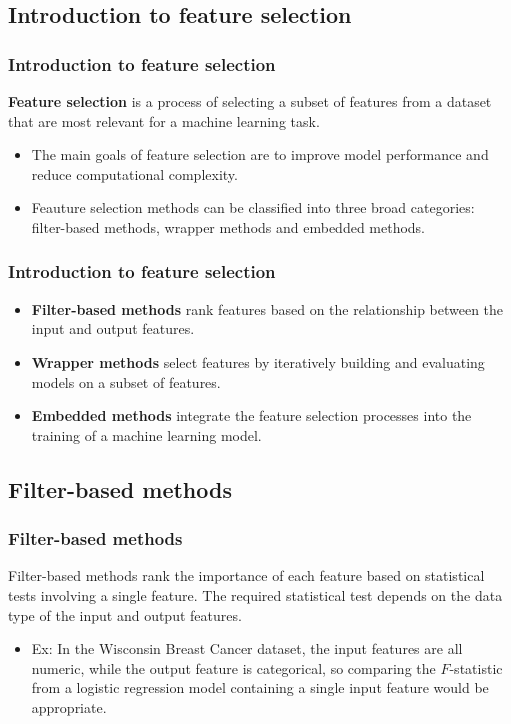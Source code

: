 \documentclass[8pt,dvipsnames]{beamer}
\begin{document}
\subsection{Introduction to feature selection}
\begin{frame}
    \frametitle{Introduction to feature selection}
    \textbf{Feature selection} is a process of selecting a subset of features from a dataset that are most relevant for a machine learning task.
    \begin{itemize}
        \item The main goals of feature selection are to improve model performance and reduce computational complexity.
        \item Feauture selection methods can be classified into three broad categories: filter-based methods, wrapper methods and embedded methods.
    \end{itemize}
\end{frame}

\begin{frame}
    \frametitle{Introduction to feature selection}
    \begin{itemize}
        \item \textbf{Filter-based methods} rank features based on the relationship between the input and output features.
        \item \textbf{Wrapper methods} select features by iteratively building and evaluating models on a subset of features.
        \item \textbf{Embedded methods} integrate the feature selection processes into the training of a machine learning model.
    \end{itemize}
\end{frame}

\subsection{Filter-based methods}
\begin{frame}
    \frametitle{Filter-based methods}
    Filter-based methods rank the importance of each feature based on statistical tests involving a single feature. The required statistical test depends on the data type of the input and output features.
    \begin{itemize}
        \item Ex: In the Wisconsin Breast Cancer dataset, the input features are all numeric, while the output feature is categorical, so comparing the \(F\)-statistic from a logistic regression model containing a single input feature would be appropriate.
    \end{itemize}
\end{frame}
\end{document}
